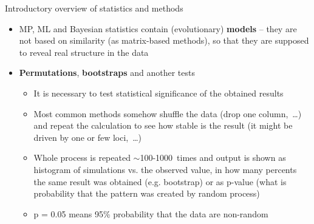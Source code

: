 \documentclass[compress, ucs, xelatex, 11pt, xcolor=svgnames,
  hyperref={
    bookmarks=true,
    unicode=true,
    colorlinks=true,
    pdftitle={Molecular data in R},
    plainpages=false,
    pdfauthor={Vojtech Zeisek},
    pdfsubject={Course about phylogeny and evolution in R},
    pdfcreator={XeLaTeX},
    pdfkeywords={R, evolution, phylogeny, molecular data},
    linkcolor=Tomato,
    anchorcolor=SaddleBrown,
    citecolor=Goldenrod,
    filecolor=DarkMagenta,
    menucolor=Sienna,
    urlcolor=DarkTurquoise,
    pdftex},
  url={hyphens, lowtilde} %
  ]{beamer}
\begin{document}
\begin{frame}[allowframebreaks]{Introductory overview of statistics and methods}
\begin{itemize}
    \begin{itemize}
      \item Based on \href{https://en.wikipedia.org/wiki/Bayes_theorem}{Bayesian theorem} -- probability of model under given data
      \item Methods are looking for the best (e.g. evolutionary) \textbf{model} (e.g. phylogenetic tree) \textbf{explainig the data} (e.g. DNA sequences)
      \item Algorithm exploring possible models and approaching the best runs in steps (generations)
      \begin{itemize}
	\item After some time it converges to find optimal solution (usually described by logarithms of likelihood of given model)
	\item Usually, $\sim$millions (or even more) of generations are required
	\item Beginning use to be very unstable -- it is discarded as burn-in (``heating'' of Markov Chain Monte Carlo (MCMC) doing the exploration and optimization of models), usually $\sim$10-25\%~of steps
      \end{itemize}
    \end{itemize}
    \item MP, ML and Bayesian statistics contain (evolutionary) \textbf{models} -- they are not based on similarity (as matrix-based methods), so that they are supposed to reveal real structure in the data
    \item \textbf{Permutations}, \textbf{bootstraps} and another tests
    \begin{itemize}
      \item It is necessary to test statistical significance of the obtained results
      \item Most common methods somehow shuffle the data (drop one column,~\ldots) and repeat the calculation to see how stable is the result (it might be driven by one or few loci,~\ldots)
      \item Whole process is repeated $\sim$100-1000~times and output is shown as histogram of simulations vs. the observed value, in how many percents the same result was obtained (e.g. bootstrap) or as p-value (what is probability that the pattern was created by random process)
      \item p = 0.05 means 95\% probability that the data are non-random
    \end{itemize}
  \end{itemize}
\end{frame}
\end{document}

